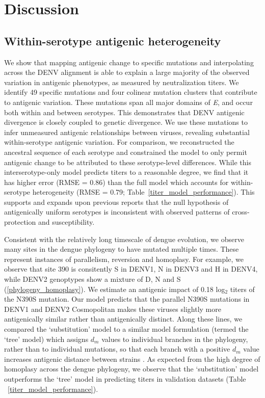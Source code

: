 \documentclass[11pt,oneside,letterpaper]{article}
\begin{document}
\section*{Discussion}

\subsection*{Within-serotype antigenic heterogeneity}

We show that mapping antigenic change to specific mutations and interpolating across the DENV alignment is able to explain a large majority of the observed variation in antigenic phenotypes, as measured by neutralization titers.
We identify 49 specific mutations and four colinear mutation clusters that contribute to antigenic variation.
These mutations span all major domains of \textit{E}, and occur both within and between serotypes.
This demonstrates that DENV antigenic divergence is closely coupled to genetic divergence.
We use these mutations to infer unmeasured antigenic relationships between viruses, revealing substantial within-serotype antigenic variation.
For comparison, we reconstructed the ancestral sequence of each serotype and constrained the model to only permit antigenic change to be attributed to these serotype-level differences.
While this interserotype-only model predicts titers to a reasonable degree, we find that it has higher error (RMSE = 0.86) than the full model which accounts for within-serotype heterogeneity (RMSE = 0.79; Table~\ref{titer_model_performance}).
This supports and expands upon previous reports \citep{katzelnick2015dengue,forshey2016incomplete,waggoner2016homotypic} that the null hypothesis of antigenically uniform serotypes is inconsistent with observed patterns of cross-protection and susceptibility.

Consistent with the relatively long timescale of dengue evolution, we observe many sites in the dengue phylogeny to have mutated multiple times.
These represent instances of parallelism, reversion and homoplasy.
For example, we observe that site 390 is consitently S in DENV1, N in DENV3 and H in DENV4, while DENV2 genoptypes show a mixture of D, N and S (\ref{phylogeny_homoplasy}).
We estimate an antigenic impact of 0.18 log$_2$ titers of the N390S mutation.
Our model predicts that the parallel N390S mutations in DENV1 and DENV2 Cosmopolitan makes these viruses slightly more antigenically similar rather than antigenically distinct.
Along these lines, we compared the `substitution' model to a similar model formulation (termed the `tree' model) which assigns $d_m$ values to individual branches in the phylogeny, rather than to individual mutations, so that each branch with a positive $d_m$ value increases antigenic distance between strains \citep{neher2016prediction}.
As expected from the high degree of homoplasy across the dengue phylogeny, we observe that the `substitution' model outperforms the `tree' model in predicting titers in validation datasets (Table ~\ref{titer_model_performance}).
\end{document}
